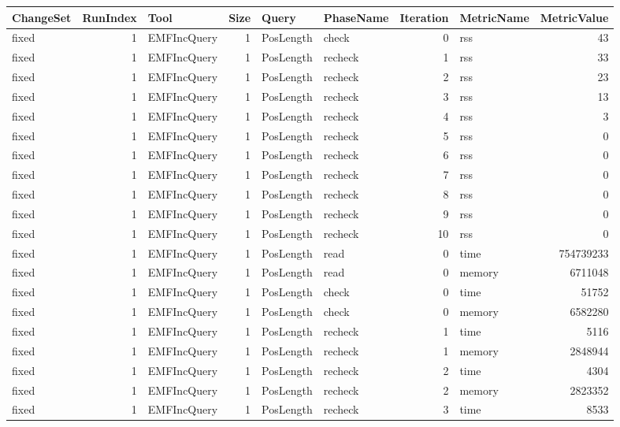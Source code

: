 \documentclass[submission,copyright,creativecommons]{eptcs}
\begin{document}
\begin{table}
\centering
\footnotesize
\begin{tabular}{| l | r | l | r | l | l | r | l | r |}
\hline
\sf ChangeSet & \sf RunIndex & \sf Tool & \sf Size & \sf Query & \sf PhaseName & \sf Iteration & \sf MetricName & \sf MetricValue\\\hline
fixed & 1 & EMFIncQuery & 1 & PosLength & check & 0 & rss & 43\\\hline
fixed & 1 & EMFIncQuery & 1 & PosLength & recheck & 1 & rss & 33\\\hline
fixed & 1 & EMFIncQuery & 1 & PosLength & recheck & 2 & rss & 23\\\hline
fixed & 1 & EMFIncQuery & 1 & PosLength & recheck & 3 & rss & 13\\\hline
fixed & 1 & EMFIncQuery & 1 & PosLength & recheck & 4 & rss & 3\\\hline
fixed & 1 & EMFIncQuery & 1 & PosLength & recheck & 5 & rss & 0\\\hline
fixed & 1 & EMFIncQuery & 1 & PosLength & recheck & 6 & rss & 0\\\hline
fixed & 1 & EMFIncQuery & 1 & PosLength & recheck & 7 & rss & 0\\\hline
fixed & 1 & EMFIncQuery & 1 & PosLength & recheck & 8 & rss & 0\\\hline
fixed & 1 & EMFIncQuery & 1 & PosLength & recheck & 9 & rss & 0\\\hline
fixed & 1 & EMFIncQuery & 1 & PosLength & recheck & 10 & rss & 0\\\hline
fixed & 1 & EMFIncQuery & 1 & PosLength & read & 0 & time & 754739233\\\hline
fixed & 1 & EMFIncQuery & 1 & PosLength & read & 0 & memory & 6711048\\\hline
fixed & 1 & EMFIncQuery & 1 & PosLength & check & 0 & time & 51752\\\hline
fixed & 1 & EMFIncQuery & 1 & PosLength & check & 0 & memory & 6582280\\\hline
fixed & 1 & EMFIncQuery & 1 & PosLength & recheck & 1 & time & 5116\\\hline
fixed & 1 & EMFIncQuery & 1 & PosLength & recheck & 1 & memory & 2848944\\\hline
fixed & 1 & EMFIncQuery & 1 & PosLength & recheck & 2 & time & 4304\\\hline
fixed & 1 & EMFIncQuery & 1 & PosLength & recheck & 2 & memory & 2823352\\\hline
fixed & 1 & EMFIncQuery & 1 & PosLength & recheck & 3 & time & 8533\\\hline

\end{tabular}
\end{table}
\end{document}
